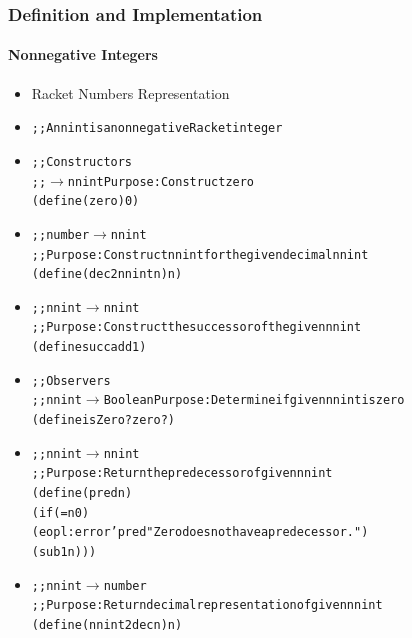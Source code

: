 \documentclass{beamer}
\newcommand{\arrow}{\(\rightarrow\)}
\begin{document}
\begin{frame}[fragile]
\frametitle{Definition and Implementation}
\framesubtitle{Nonnegative Integers}
\begin{scriptsize}
\begin{itemize}
\item<1-> Racket Numbers Representation

\item<2->
\begin{alltt}
;; A nnint is a nonnegative Racket integer
\end{alltt}

\item<3->
\begin{alltt}
;; Constructors
;;  \arrow{} nnint    Purpose: Construct zero
(define (zero) 0)
\end{alltt}

\item<4->
\begin{alltt}
;; number \arrow{} nnint
;; Purpose: Construct nnint for the given decimal nnint
(define (dec2nnint n) n)
\end{alltt}

\item<5->
\begin{alltt}
;; nnint \arrow{} nnint
;; Purpose: Construct the successor of the given nnint
(define succ add1)
\end{alltt}

\item<6->
\begin{alltt}
;; Observers
;; nnint \arrow{} Boolean  Purpose: Determine if given nnint is zero
(define isZero? zero?)
\end{alltt}

\item<7->
\begin{alltt}
;; nnint \arrow{} nnint
;; Purpose: Return the predecessor of given nnint
(define (pred n)
  (if (= n 0)
      (eopl:error 'pred "Zero does not have a predecessor.")
      (sub1 n)))
\end{alltt}

\item<8->
\begin{alltt}
;; nnint \arrow{} number
;; Purpose: Return decimal representation of given nnint
(define (nnint2dec n) n)
\end{alltt}

\end{itemize}
\end{scriptsize}
\end{frame}
\end{document}
